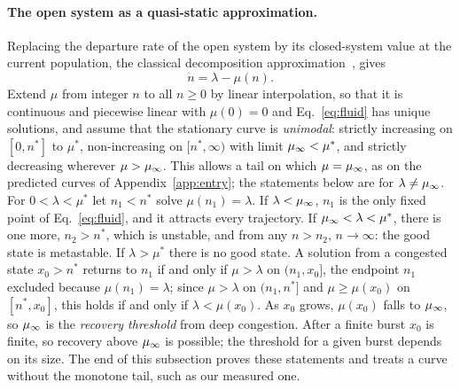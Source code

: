 \paragraph{The open system as a quasi-static approximation.}\label{sec:fluid}
Replacing the departure rate of the open system by its closed-system value at the current population, the classical decomposition approximation~\citep{courtois1975decomposability,kleinrock1975aloha}, gives
\begin{equation}\label{eq:fluid}
\dot n=\lambda-\mu(n).
\end{equation}
Extend $\mu$ from integer $n$ to all $n\ge0$ by linear interpolation, so that it is continuous and piecewise linear with $\mu(0)=0$ and Eq.~\eqref{eq:fluid} has unique solutions, and assume that the stationary curve is \emph{unimodal}: strictly increasing on $[0,n^*]$ to $\mu^*$, non-increasing on $[n^*,\infty)$ with limit $\mu_{\infty}<\mu^*$, and strictly decreasing wherever $\mu>\mu_{\infty}$. This allows a tail on which $\mu=\mu_{\infty}$, as on the predicted curves of Appendix~\ref{app:entry}; the statements below are for $\lambda\ne\mu_{\infty}$. For $0<\lambda<\mu^*$ let $n_1<n^*$ solve $\mu(n_1)=\lambda$. If $\lambda<\mu_{\infty}$, $n_1$ is the only fixed point of Eq.~\eqref{eq:fluid}, and it attracts every trajectory. If $\mu_{\infty}<\lambda<\mu^*$, there is one more, $n_2>n^*$, which is unstable, and from any $n>n_2$, $n\to\infty$: the good state is metastable. If $\lambda>\mu^*$ there is no good state. A solution from a congested state $x_0>n^*$ returns to $n_1$ if and only if $\mu>\lambda$ on $(n_1,x_0]$, the endpoint $n_1$ excluded because $\mu(n_1)=\lambda$; since $\mu>\lambda$ on $(n_1,n^*]$ and $\mu\ge\mu(x_0)$ on $[n^*,x_0]$, this holds if and only if $\lambda<\mu(x_0)$. As $x_0$ grows, $\mu(x_0)$ falls to $\mu_{\infty}$, so $\mu_{\infty}$ is the \emph{recovery threshold} from deep congestion. After a finite burst $x_0$ is finite, so recovery above $\mu_{\infty}$ is possible; the threshold for a given burst depends on its size. The end of this subsection proves these statements and treats a curve without the monotone tail, such as our measured one.

